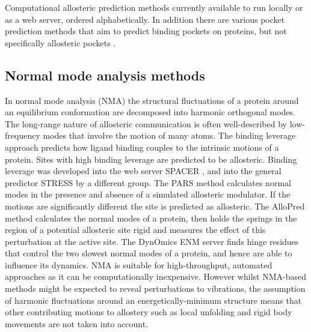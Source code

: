 \begin{table}
\caption{Computational allosteric prediction methods currently available to run locally or as a web server, ordered alphabetically.
In addition there are various pocket prediction methods that aim to predict binding pockets on proteins, but not specifically allosteric pockets \cite{Huang2006, LeGuilloux2009, Cimmermancic2016}.}

\end{table}

\subsection{Normal mode analysis methods}

In normal mode analysis (NMA) the structural fluctuations of a protein around an equilibrium conformation are decomposed into harmonic orthogonal modes.
The long-range nature of allosteric communication is often well-described by low-frequency modes that involve the motion of many atoms.
The binding leverage approach \cite{Mitternacht2011} predicts how ligand binding couples to the intrinsic motions of a protein.
Sites with high binding leverage are predicted to be allosteric.
Binding leverage was developed into the web server SPACER \cite{Goncearenco2013}, and into the general predictor STRESS \cite{Clarke2016} by a different group.
The PARS method \cite{Panjkovich2012, Panjkovich2014} calculates normal modes in the presence and absence of a simulated allosteric modulator.
If the motions are significantly different the site is predicted as allosteric.
The AlloPred method \cite{Greener2015} calculates the normal modes of a protein, then holds the springs in the region of a potential allosteric site rigid and measures the effect of this perturbation at the active site.
The DynOmics ENM server \cite{Li2017} finds hinge residues that control the two slowest normal modes of a protein, and hence are able to influence its dynamics.
NMA is suitable for high-throughput, automated approaches as it can be computationally inexpensive.
However whilst NMA-based methods might be expected to reveal perturbations to vibrations, the assumption of harmonic fluctuations around an energetically-minimum structure means that other contributing motions to allostery such as local unfolding and rigid body movements \cite{Motlagh2014} are not taken into account.

